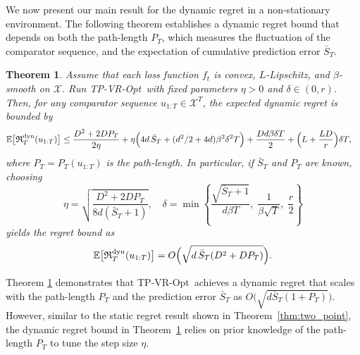 \documentclass[journal,onecolumn]{IEEEtran}
\newcommand{\cX}{\mathcal{X}}
\theoremstyle{plain}
\newtheorem{theorem}{Theorem}[section]
\theoremstyle{definition}
\theoremstyle{remark}
\newcommand{\regret}{\mathfrak{R}}
\newcommand{\tpvr}{{\sc TP-VR-Opt}}
\begin{document}
We now present our main result for the dynamic regret in a non-stationary environment. The following theorem
establishes a dynamic regret bound that depends on both the path-length $P_{T}$, which
measures the fluctuation of the comparator sequence, and the expectation of cumulative prediction error $\bar
{S}_{T}$.

\begin{theorem}
    \label{thm:dynamic_regret} Assume that each loss function $f_{t}$ is convex,
    $L$-Lipschitz, and $\beta$-smooth on $\cX$. Run \tpvr\, with fixed parameters
    $\eta>0$ and $\delta\in(0,r)$. Then, for any comparator sequence $u_{1:T}\in
    \cX^T$, the expected dynamic regret is bounded by
    \begin{align*}
        &\mathbb{E}\bigl[\regret^{\mathrm{dyn}}_{T}(u_{1:T})\bigr]\le  \frac{D^{2}+ 2D P_{T}}{2\eta}+\eta \Bigl( 4d\,\bar{S}_{T}+ (d^{2}/2 + 4d)\beta^{2}\delta^{2}T \Bigr)  +\frac{D d \beta \delta T}{2}+ \Bigl( L + \frac{LD}{r}\Bigr) \delta T,
    \end{align*}
    where $P_{T}= P_{T}(u_{1:T})$ is the path-length. In particular, if
    $\bar{S}_{T}$ and $P_{T}$ are known, choosing
    \begin{equation*}
        \eta = \sqrt{\frac{D^{2}+ 2D P_{T}}{8d(\bar{S}_{T}+1)}},\quad
        \delta = \min\left\{ \frac{\sqrt{\bar{S}_{T}+1}}{d \beta T}, \; \frac{1}{\beta
        \sqrt{T}}, \; \frac{r}{2}\right\}
    \end{equation*}
    yields the regret bound as
    \begin{equation*}
        \mathbb{E}\bigl[\regret^{\mathrm{dyn}}_{T}(u_{1:T})\bigr] =O\Bigl( \sqrt{d\,\bar{S}_{T}(D^{2}+
        D P_{T})}\Bigr).
    \end{equation*}
\end{theorem}

Theorem \ref{thm:dynamic_regret} demonstrates that \tpvr\, achieves a dynamic
regret that scales with the path-length $P_{T}$ and the prediction error
$\bar{S}_{T}$ as $O\big(\sqrt{ d\bar{S}_T  (1+P_T)}\big)$. However, similar to the static regret result shown in Theorem~\ref{thm:two_point},
the dynamic regret bound in Theorem~\ref{thm:dynamic_regret} relies on prior
knowledge of the path-length $P_{T}$ to tune the step size $\eta$.
\end{document}
